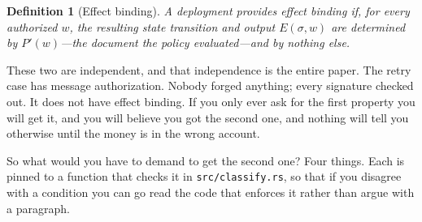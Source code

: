 \documentclass[11pt]{article}
\newtheorem{definition}{Definition}
\begin{document}
\begin{definition}[Effect binding]
A deployment provides effect binding if, for every authorized $w$, the
resulting state transition and output $E(\sigma, w)$ are determined by
$P'(w)$---the document the policy evaluated---and by nothing else.
\end{definition}

These two are independent, and that independence is the entire paper. The
retry case has message authorization. Nobody forged anything; every signature
checked out. It does not have effect binding. If you only ever ask for the
first property you will get it, and you will believe you got the second one,
and nothing will tell you otherwise until the money is in the wrong account.

So what would you have to demand to get the second one? Four things. Each is
pinned to a function that checks it in \texttt{src/classify.rs}, so that if
you disagree with a condition you can go read the code that enforces it rather
than argue with a paragraph.
\end{document}
